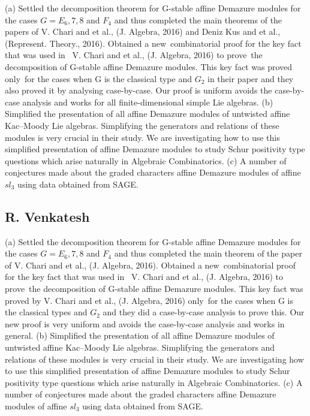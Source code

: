 (a) Settled the decomposition theorem for G-stable affine Demazure modules for the cases $G = E_6,7,8$ and $F_4$ and thus completed the main theorems of the papers of V. Chari and et al., (J. Algebra, 2016) and Deniz Kus and et al., (Represent. Theory., 2016). Obtained a new combinatorial proof for the key fact that was used in  V. Chari and et al., (J. Algebra, 2016) to prove the decomposition of G-stable affine Demazure modules. This key fact was proved only for the cases when G is the classical type and $G_2$ in their paper and they also proved it by analysing case-by-case. Our proof is uniform avoids the case-by-case analysis and works for all finite-dimensional simple Lie algebras.  (b) Simplified the presentation of all affine Demazure modules of untwisted affine Kac–Moody Lie algebras. Simplifying the generators and relations of these modules is very crucial in their study. We are investigating how to use this simplified presentation of affine Demazure modules to study Schur positivity type questions which arise naturally in Algebraic Combinatorics.   (c) A number of conjectures made about the graded characters affine Demazure modules of affine $sl_3$ using data obtained from SAGE. 


\subsection{R. Venkatesh}

(a) Settled the decomposition theorem for G-stable affine Demazure modules for the cases $G = E_6,7,8$ and $F_4$ and thus completed the main theorem of the paper of V. Chari and et al., (J. Algebra, 2016). Obtained a new combinatorial proof for the key fact that was used in  V. Chari and et al., (J. Algebra, 2016) to prove the decomposition of G-stable affine Demazure modules. This key fact was proved by V. Chari and et al., (J. Algebra, 2016) only for the cases when G is the classical types and $G_2$ and they did a case-by-case analysis to prove this. Our new proof is very uniform and avoids the case-by-case analysis and works in general.  (b) Simplified the presentation of all affine Demazure modules of untwisted affine Kac–Moody Lie algebras. Simplifying the generators and relations of these modules is very crucial in their study. We are investigating how to use this simplified presentation of affine Demazure modules to study Schur positivity type questions which arise naturally in Algebraic Combinatorics.   (c) A number of conjectures made about the graded characters affine Demazure modules of affine $sl_3$ using data obtained from SAGE. 


